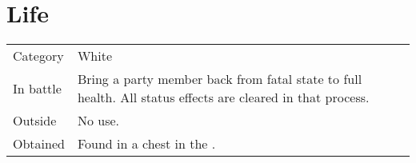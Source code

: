 \section{Life}
\label{spell:life}


\noindent\begin{tabularx}{\textwidth}[l]{lX}
	Category
	& White
\\
	In battle
	& Bring a party member back from fatal state to full health. All status effects are cleared in that process.
\\
	Outside
	& No use.
\\
	Obtained
	& Found in a chest in the \nameref{map:lava_dome}.
\end{tabularx}

